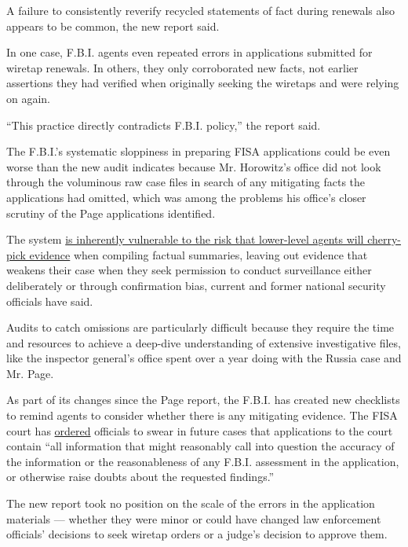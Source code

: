A failure to consistently reverify recycled statements of fact during
renewals also appears to be common, the new report said.

In one case, F.B.I. agents even repeated errors in applications
submitted for wiretap renewals. In others, they only corroborated new
facts, not earlier assertions they had verified when originally seeking
the wiretaps and were relying on again.

``This practice directly contradicts F.B.I. policy,'' the report said.

The F.B.I.'s systematic sloppiness in preparing FISA applications could
be even worse than the new audit indicates because Mr. Horowitz's office
did not look through the voluminous raw case files in search of any
mitigating facts the applications had omitted, which was among the
problems his office's closer scrutiny of the Page applications
identified.

The system
\href{https://www.nytimes3xbfgragh.onion/2020/02/23/us/politics/fisa-surveillance-fbi.html}{is
inherently vulnerable to the risk that lower-level agents will
cherry-pick evidence} when compiling factual summaries, leaving out
evidence that weakens their case when they seek permission to conduct
surveillance either deliberately or through confirmation bias, current
and former national security officials have said.

Audits to catch omissions are particularly difficult because they
require the time and resources to achieve a deep-dive understanding of
extensive investigative files, like the inspector general's office spent
over a year doing with the Russia case and Mr. Page.

As part of its changes since the Page report, the F.B.I. has created new
checklists to remind agents to consider whether there is any mitigating
evidence. The FISA court has
\href{https://www.nytimes3xbfgragh.onion/2020/03/04/us/politics/fisa-court-fbi-surveillance.html}{ordered}
officials to swear in future cases that applications to the court
contain ``all information that might reasonably call into question the
accuracy of the information or the reasonableness of any F.B.I.
assessment in the application, or otherwise raise doubts about the
requested findings.''

The new report took no position on the scale of the errors in the
application materials --- whether they were minor or could have changed
law enforcement officials' decisions to seek wiretap orders or a judge's
decision to approve them.

